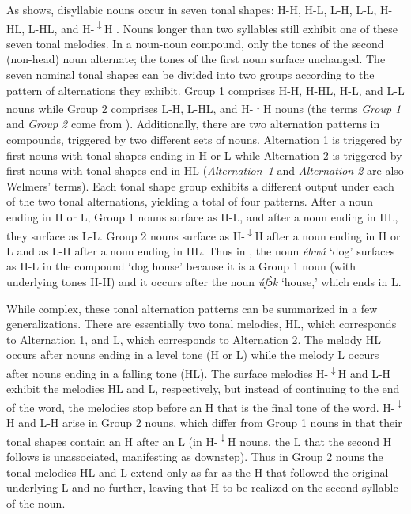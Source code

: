 \documentclass[output=paper]{langscibook}
\begin{document}
As  shows, disyllabic nouns occur in seven tonal shapes: H-H, H-L, L-H, L-L, H-HL, L-HL, and H-\textsuperscript{$\downarrow$}H \citep[86]{Welmers1968}. Nouns longer than two syllables still exhibit one of these seven tonal melodies. In a noun-noun compound, only the tones of the second (non-head) noun alternate; the tones of the first noun surface unchanged. The seven nominal tonal shapes can be divided into two groups according to the pattern of alternations they exhibit. Group 1 comprises H-H, H-HL, H-L, and L-L nouns while Group 2 comprises L-H, L-HL, and H-\textsuperscript{$\downarrow$}H nouns (the terms \textit{Group 1} and \textit{Group 2} come from \citealt{Welmers1968}). Additionally, there are two alternation patterns in compounds, triggered by two different sets of nouns. Alternation 1 is triggered by first nouns with tonal shapes ending in H or L while Alternation 2 is triggered by first nouns with tonal shapes end in HL (\textit{Alternation~1} and \textit{Alternation 2} are also Welmers’ terms). Each tonal shape group exhibits a different output under each of the two tonal alternations, yielding a total of four patterns. After a noun ending in H or L, Group 1 nouns surface as H-L, and after a noun ending in HL, they surface as L-L. Group 2 nouns surface as H-\textsuperscript{$\downarrow$}H after a noun ending in H or L and as L-H after a noun ending in HL. Thus in , the noun \textit{ébwá} ‘dog’ surfaces as H-L in the compound ‘dog house’ because it is a Group 1 noun (with underlying tones H-H) and it occurs after the noun \textit{úfɔ̀k} ‘house,’ which ends in L.  

While complex, these tonal alternation patterns can be summarized in a few generalizations. There are essentially two tonal melodies, HL, which corresponds to Alternation 1, and L, which corresponds to Alternation 2. The melody HL occurs after nouns ending in a level tone (H or L) while the melody L occurs after nouns ending in a falling tone (HL). The surface melodies H-\textsuperscript{$\downarrow$}H and L-H exhibit the melodies HL and L, respectively, but instead of continuing to the end of the word, the melodies stop before an H that is the final tone of the word. H-\textsuperscript{$\downarrow$}H and L-H arise in Group 2 nouns, which differ from Group 1 nouns in that their tonal shapes contain an H after an L (in H-\textsuperscript{$\downarrow$}H nouns, the L that the second H follows is unassociated, manifesting as downstep). Thus in Group 2 nouns the tonal melodies HL and L extend only as far as the H that followed the original underlying L and no further, leaving that H to be realized on the second syllable of the noun. 
\end{document}
